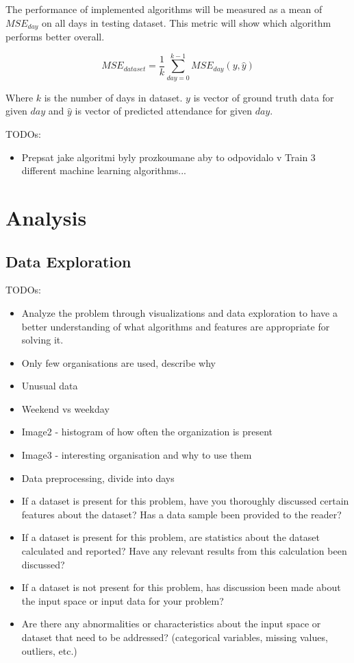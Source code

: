 \documentclass{article}
\begin{document}
The performance of implemented algorithms will be measured as a mean of $MSE_{day}$ on all days in testing dataset. This metric will show which algorithm performs better overall.

\begin{equation}
\label{eq:mse_all}
MSE_{dataset} = \dfrac{1}{k} \sum^{k-1}_{day=0}MSE_{day}(y,\hat{y})
\end{equation}

Where $k$ is the number of days in dataset. $y$ is vector of ground truth data for given $day$ and $\hat{y}$ is vector of predicted attendance for given $day$.


\color{red}
TODOs:
\begin{itemize}
    \item Prepsat jake algoritmi byly prozkoumane aby to odpovidalo v Train 3 different machine learning algorithms...
\end{itemize}
\color{black}

\section{Analysis}
\subsection{Data Exploration} \label{sec:data_exploration}
\color{red}
TODOs:
\begin{itemize}
    \item Analyze the problem through visualizations and data exploration to have a better understanding of what algorithms and features are appropriate for solving it.
    \item Only few organisations are used, describe why
    \item Unusual data
    \item Weekend vs weekday
    \item Image2 - histogram of how often the organization is present
    \item Image3 - interesting organisation and why to use them 
    \item Data preprocessing, divide into days
    \item If a dataset is present for this problem, have you thoroughly discussed certain features about the dataset? Has a data sample been provided to the reader?
    \item If a dataset is present for this problem, are statistics about the dataset calculated and reported? Have any relevant results from this calculation been discussed?
    \item If a dataset is not present for this problem, has discussion been made about the input space or input data for your problem?
    \item Are there any abnormalities or characteristics about the input space or dataset that need to be addressed? (categorical variables, missing values, outliers, etc.)

\end{itemize}
\color{black}
\end{document}
